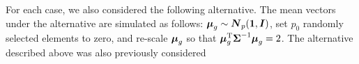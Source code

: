 \documentclass[times,sort&compress,3p]{elsarticle}
\theoremstyle{plain}%
\theoremstyle{definition}
\def\trace{\hbox{trace}}
\def\trace{\hbox{trace}}
\def\trans{^{\rm T}}
\newcommand{\uI}       {\mbox{\boldmath$I$}}
\newcommand{\uN}       {\mbox{\boldmath$N$}}
\newcommand{\umu}               {\mbox{\boldmath$\mu$}}
\newcommand{\uSigma}            {\mbox{\boldmath$\Sigma$}}
\begin{document}
For each case, we also considered the following alternative. The mean vectors under the alternative are simulated as follows:
 $\umu_g \sim \uN_{p}(\bf{1}, \uI)$, set $p_0$ randomly selected elements to zero, and re-scale $\umu_g$ so that $\umu_g \trans\uSigma ^{-1}  \umu_g = 2$.
The alternative described above was also previously considered \cite{srivastava2014raptt,zoh2018powerful} %
\end{document}
